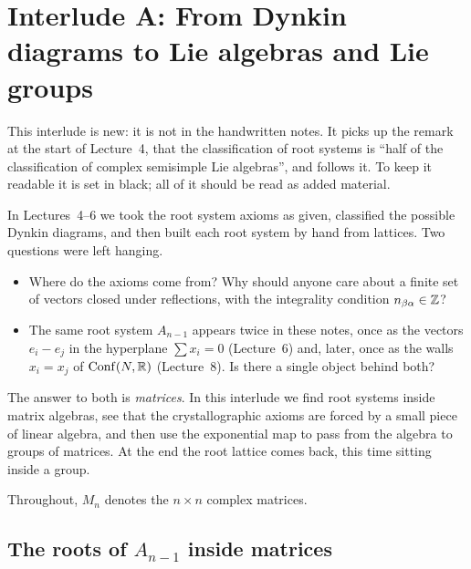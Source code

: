 
\chapter[Interlude A: Lie algebras and Lie groups]{Interlude A: From Dynkin diagrams to Lie algebras and Lie groups}
\label{LIE:ch}

\begin{addedblock}
This interlude is new: it is not in the handwritten notes. It picks up the remark at the start of
Lecture~4, that the classification of root systems is ``half of the classification of complex
semisimple Lie algebras'', and follows it. To keep it readable it is set in black; all of it should be
read as added material.
\end{addedblock}

In Lectures~4--6 we took the root system axioms as given, classified the possible Dynkin diagrams, and
then built each root system by hand from lattices. Two questions were left hanging.
\begin{itemize}
\item Where do the axioms come from? Why should anyone care about a finite set of vectors closed under
  reflections, with the integrality condition $n_{\beta\alpha}\in\mathbb{Z}$?
\item The same root system $A_{n-1}$ appears twice in these notes, once as the vectors
  $e_i-e_j$ in the hyperplane $\sum x_i=0$ (Lecture~6) and, later, once as the walls $x_i=x_j$ of
  $\operatorname{Conf}(N,\mathbb{R})$ (Lecture~8). Is there a single object behind both?
\end{itemize}
The answer to both is \emph{matrices}. In this interlude we find root systems inside matrix
algebras, see that the crystallographic axioms are forced by a small piece of linear algebra, and
then use the exponential map to pass from the algebra to groups of matrices. At the end the root
lattice comes back, this time sitting inside a group.

Throughout, $M_n$ denotes the $n\times n$ complex matrices.

\section{The roots of \texorpdfstring{$A_{n-1}$}{A(n-1)} inside matrices}
\label{LIE:sec:sln}

